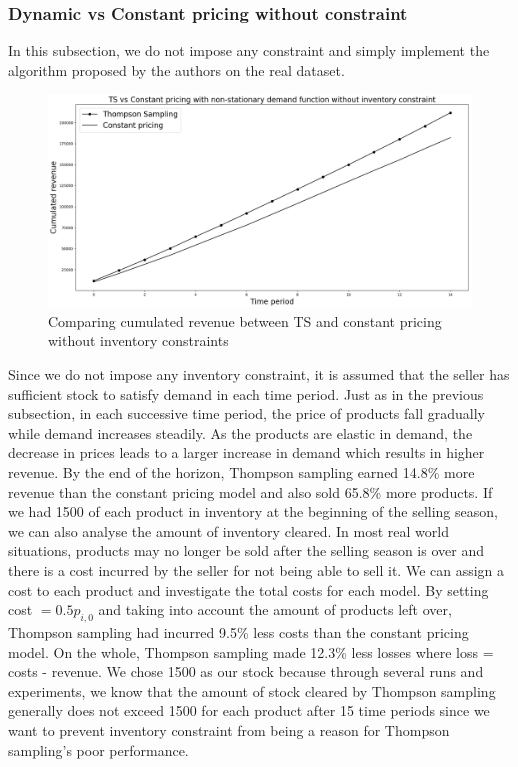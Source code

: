 \documentclass[a4paper]{article}
\begin{document}
\subsubsection{Dynamic vs Constant pricing without constraint}
In this subsection, we do not impose any constraint and simply implement the algorithm proposed by the authors on the real dataset.
\begin{figure}[h]
	\centering
	\includegraphics[width=1.03\textwidth]{512.png}
	\caption{\label{fig:four}Comparing cumulated revenue between TS and constant pricing without inventory constraints}
\end{figure}
\newline
Since we do not impose any inventory constraint, it is assumed that the seller has sufficient stock to satisfy demand in each time period. Just as in the previous subsection, in each successive time period, the price of products fall gradually while demand increases steadily. As the products are elastic in demand, the decrease in prices leads to a larger increase in demand which results in higher revenue.
\newline
\newline
By the end of the horizon, Thompson sampling earned 14.8\% more revenue than the constant pricing model and also sold 65.8\% more products. If we had 1500 of each product in inventory at the beginning of the selling season, we can also analyse the amount of inventory cleared. In most real world situations, products may no longer be sold after the selling season is over and there is a cost incurred by the seller for not being able to sell it. We can assign a cost to each product and investigate the total costs for each model. By setting cost $= 0.5  p_{i,0}$ and taking into account the amount of products left over, Thompson sampling had incurred 9.5\% less costs than the constant pricing model. On the whole, Thompson sampling made 12.3\% less losses where loss = costs - revenue. We chose 1500 as our stock because through several runs and experiments, we know that the amount of stock cleared by Thompson sampling generally does not exceed 1500 for each product after 15 time periods since we want to prevent inventory constraint from being a reason for Thompson sampling's poor performance.
\end{document}
